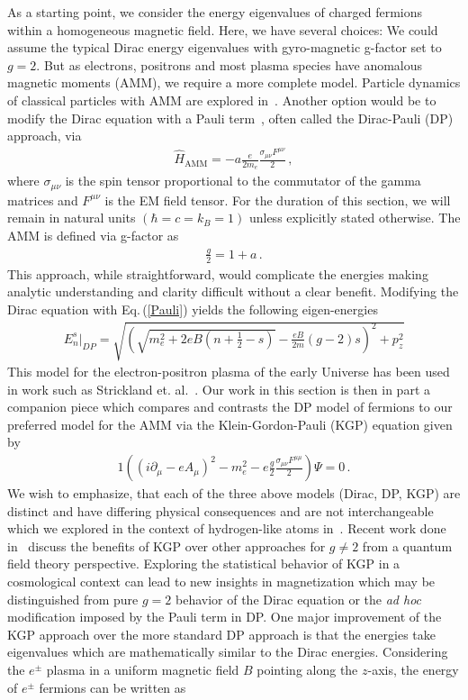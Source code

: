 \documentclass[universe,article,submit,moreauthors,pdftex,a4paper]{Definitions/mdpi}
\newcommand{\req}[1]{Eq.\,(\ref{#1})}
\newcommand*{\xblue}{\color{blue}}
\begin{document}
As a starting point, we consider the energy eigenvalues of charged fermions within a homogeneous magnetic field. Here, we have several choices: We could assume the typical Dirac energy eigenvalues with gyro-magnetic g-factor set to $g=2$. But as electrons, positrons and most plasma species have anomalous magnetic moments (AMM), we require a more complete model. {\xblue Particle dynamics of classical particles with AMM are explored in~\cite{Rafelski:2017hce,Formanek:2017mbv,Formanek:2020zwc,Formanek:2021mcp}.} Another option would be to modify the Dirac equation with a Pauli term~\cite{thaller2013dirac}, often called the Dirac-Pauli (DP) approach, via
\begin{align}
 \label{Pauli} \hat{H}_{\mathrm{AMM}} = -a\frac{e}{2m_{e}}\frac{\sigma_{\mu\nu}F^{\mu\nu}}{2}\,,
\end{align}
where $\sigma_{\mu\nu}$ is the spin tensor proportional to the commutator of the gamma matrices and $F^{\mu\nu}$ is the EM field tensor. For the duration of this section, we will remain in natural units $(\hbar=c=k_{B}=1)$ unless explicitly stated otherwise. The AMM is defined via g-factor as
\begin{align}
 \label{AMM} \frac{g}{2}=1+a\,.
\end{align}
This approach, while straightforward, would complicate the energies making analytic understanding and clarity difficult without a clear benefit. Modifying the Dirac equation with \req{Pauli} yields the following eigen-energies
\begin{align}
 \label{DPEnergy} E_{n}^{s}\vert_{DP}=\sqrt{\left(\sqrt{m_{e}^{2}+2eB\left(n+\frac{1}{2}-s\right)}-\frac{eB}{2m}(g-2)s\right)^{2}+p_{z}^{2}}
\end{align}
This model for the electron-positron plasma of the early Universe has been used in work such as Strickland et. al.~\cite{Strickland:2012vu}. Our work in this section is then in part a companion piece which compares and contrasts the DP model of fermions to our preferred model for the AMM via the Klein-Gordon-Pauli (KGP) equation given by
\begin{alignat}{1}
 \label{KGP} \left(\left(i\partial_{\mu}-eA_{\mu}\right)^{2}-m_{e}^{2}-e\frac{g}{2}\frac{\sigma_{\mu\nu}F^{\mu\mu}}{2}\right)\Psi=0\,.
\end{alignat}
We wish to emphasize, that each of the three above models (Dirac, DP, KGP) are distinct and have differing physical consequences and are not interchangeable which we explored in the context of hydrogen-like atoms in~\cite{Steinmetz:2018ryf}. Recent work done in~\cite{rafelski2023study} discuss the benefits of KGP over other approaches for $g\neq2$ from a quantum field theory perspective. Exploring the statistical behavior of KGP in a cosmological context can lead to new insights in magnetization which may be distinguished from pure $g=2$ behavior of the Dirac equation or the \emph{ad hoc} modification imposed by the Pauli term in DP. One major improvement of the KGP approach over the more standard DP approach is that the energies take eigenvalues which are mathematically similar to the Dirac energies. Considering the $e^\pm$ plasma in a uniform magnetic field $B$ pointing along the $z$-axis, the energy of $e^\pm$ fermions can be written as
\end{document}
